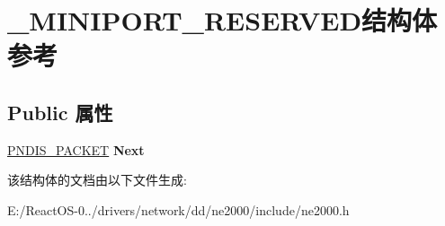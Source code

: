 \hypertarget{struct___m_i_n_i_p_o_r_t___r_e_s_e_r_v_e_d}{}\section{\+\_\+\+M\+I\+N\+I\+P\+O\+R\+T\+\_\+\+R\+E\+S\+E\+R\+V\+E\+D结构体 参考}
\label{struct___m_i_n_i_p_o_r_t___r_e_s_e_r_v_e_d}
\subsection*{Public 属性}
\begin{DoxyCompactItemize}
\item 
\mbox{\label{struct___m_i_n_i_p_o_r_t___r_e_s_e_r_v_e_d_a06d1871b244409d607e1b035e6af94ea}} 
\hyperlink{struct___n_d_i_s___p_a_c_k_e_t}{P\+N\+D\+I\+S\+\_\+\+P\+A\+C\+K\+ET} {\bfseries Next}
\end{DoxyCompactItemize}


该结构体的文档由以下文件生成\+:\begin{DoxyCompactItemize}
\item 
E\+:/\+React\+O\+S-\/0../drivers/network/dd/ne2000/include/ne2000.\+h\end{DoxyCompactItemize}
